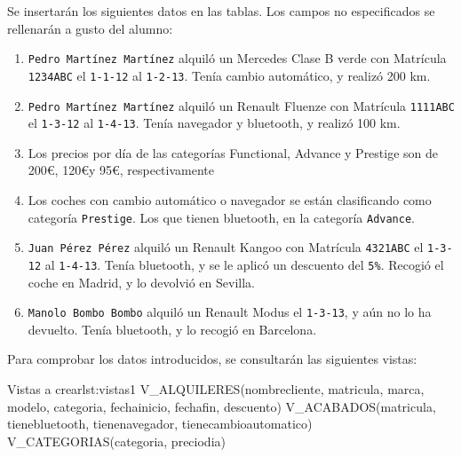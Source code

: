 \begin{homeworkProblem}
  Se insertarán los siguientes datos en las tablas. Los campos no especificados se
  rellenarán a gusto del alumno:

  \begin{enumerate}
  \item  \texttt{Pedro Martínez Martínez} alquiló un Mercedes Clase B verde con
    Matrícula \texttt{1234ABC} el \texttt{1-1-12} al \texttt{1-2-13}. Tenía cambio automático, y
    realizó 200 km.
  \item  \texttt{Pedro Martínez Martínez} alquiló un Renault Fluenze con Matrícula
    \texttt{1111ABC} el \texttt{1-3-12} al \texttt{1-4-13}. Tenía navegador y bluetooth, y realizó
    100 km.
  \item  Los precios por día de las categorías Functional, Advance y Prestige
    son de 200\euro, 120\euro y 95\euro, respectivamente

  \item  Los coches con cambio automático o navegador se están clasificando
    como categoría \texttt{Prestige}. Los que tienen bluetooth, en la categoría
    \texttt{Advance}.
  \item  \texttt{Juan Pérez Pérez} alquiló un Renault Kangoo con Matrícula \texttt{4321ABC} el
    \texttt{1-3-12} al \texttt{1-4-13}. Tenía bluetooth, y se le aplicó un descuento del \texttt{5\%}.
    Recogió el coche en Madrid, y lo devolvió en Sevilla.
  \item  \texttt{Manolo Bombo Bombo} alquiló un Renault Modus el \texttt{1-3-13}, y aún no lo
    ha devuelto. Tenía bluetooth, y lo recogió en Barcelona.
  \end{enumerate}

  Para comprobar los datos introducidos, se consultarán las siguientes vistas:
  
  \begin{listadosql}{Vistas a crear}{lst:vistas1}
  V_ALQUILERES(nombrecliente, matricula, marca, modelo, categoria, fechainicio, fechafin, descuento)
  V_ACABADOS(matricula, tienebluetooth, tienenavegador, tienecambioautomatico)
  V_CATEGORIAS(categoria, preciodia)
  \end{listadosql}
\end{homeworkProblem}


